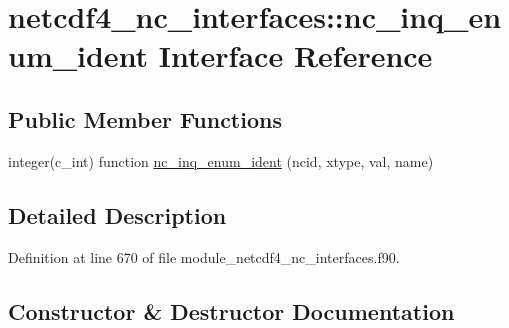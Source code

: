 \hypertarget{interfacenetcdf4__nc__interfaces_1_1nc__inq__enum__ident}{}\section{netcdf4\+\_\+nc\+\_\+interfaces\+:\+:nc\+\_\+inq\+\_\+enum\+\_\+ident Interface Reference}
\label{interfacenetcdf4__nc__interfaces_1_1nc__inq__enum__ident}
\subsection*{Public Member Functions}
\begin{DoxyCompactItemize}
\item 
integer(c\+\_\+int) function \hyperlink{interfacenetcdf4__nc__interfaces_1_1nc__inq__enum__ident_a7522554b88da6cbfdcf69d9ea2727220}{nc\+\_\+inq\+\_\+enum\+\_\+ident} (ncid, xtype, val, name)
\end{DoxyCompactItemize}


\subsection{Detailed Description}


Definition at line 670 of file module\+\_\+netcdf4\+\_\+nc\+\_\+interfaces.\+f90.



\subsection{Constructor \& Destructor Documentation}
\mbox{\label{interfacenetcdf4__nc__interfaces_1_1nc__inq__enum__ident_a7522554b88da6cbfdcf69d9ea2727220}} 
